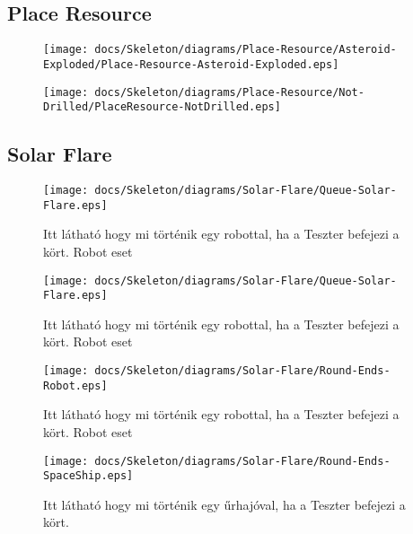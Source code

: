 \subsection{Place Resource}

\begin{figure}[H] 
    \centering 
    \texttt{[image: docs/Skeleton/diagrams/Place-Resource/Asteroid-Exploded/Place-Resource-Asteroid-Exploded.eps]} 
    \caption{} 
\end{figure} 

\begin{figure}[H] 
    \centering 
    \texttt{[image: docs/Skeleton/diagrams/Place-Resource/Not-Drilled/PlaceResource-NotDrilled.eps]} 
    \caption{} 
\end{figure} 



\subsection{Solar Flare}

\begin{figure}[H] 
    \centering 
    \texttt{[image: docs/Skeleton/diagrams/Solar-Flare/Queue-Solar-Flare.eps]} 
    \caption{Itt látható hogy mi történik egy robottal, ha a Teszter befejezi a kört. Robot eset} 
\end{figure}

\begin{figure}[H] 
    \centering 
    \texttt{[image: docs/Skeleton/diagrams/Solar-Flare/Queue-Solar-Flare.eps]} 
    \caption{Itt látható hogy mi történik egy robottal, ha a Teszter befejezi a kört. Robot eset} 
\end{figure}

\begin{figure}[H] 
    \centering 
    \texttt{[image: docs/Skeleton/diagrams/Solar-Flare/Round-Ends-Robot.eps]} 
    \caption{Itt látható hogy mi történik egy robottal, ha a Teszter befejezi a kört. Robot eset} 
\end{figure}

\begin{figure}[H] 
    \centering 
    \texttt{[image: docs/Skeleton/diagrams/Solar-Flare/Round-Ends-SpaceShip.eps]} 
    \caption{Itt látható hogy mi történik egy űrhajóval, ha a Teszter befejezi a kört.} 
\end{figure}


